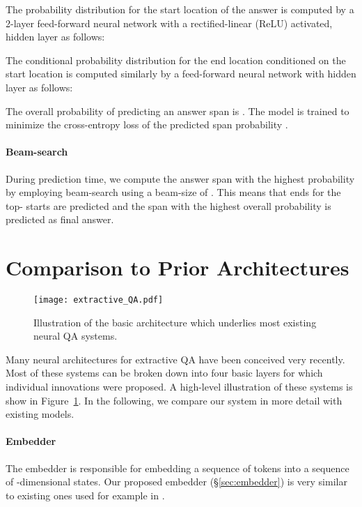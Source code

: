 \documentclass[11pt,a4paper]{article}
\begin{document}
The probability distribution  for the start location of the answer is computed by a 2-layer feed-forward neural network with a rectified-linear (ReLU) activated, hidden layer  as follows:



The conditional probability distribution  for the end location conditioned on the start location  is computed similarly by a feed-forward neural network with hidden layer  as follows:



The overall probability  of predicting an answer span  is . The model is trained to minimize the cross-entropy loss of the predicted span probability .

\paragraph{Beam-search} During prediction time, we compute the answer span with the highest probability by employing beam-search using a beam-size of . This means that ends for the top- starts are predicted and the span with the highest overall probability is predicted as final answer.


\section{Comparison to Prior Architectures}\label{sec:comparison}

\begin{figure}[t]
    \centering
    \texttt{[image: extractive\_QA.pdf]}
    \caption{Illustration of the basic architecture which underlies most existing neural QA systems.}
    \label{fig:extractive_qa}
\end{figure}

Many neural architectures for extractive QA have been conceived very recently. Most of these systems can be broken down into four basic layers for which individual innovations were proposed. A high-level illustration of these systems is show in Figure~\ref{fig:extractive_qa}. In the following, we compare our system in more detail with existing models.

\paragraph{Embedder} The embedder is responsible for embedding a sequence of tokens into a sequence of -dimensional states. Our proposed embedder (\S\ref{sec:embedder}) is very similar to existing ones used for example in .
\end{document}
